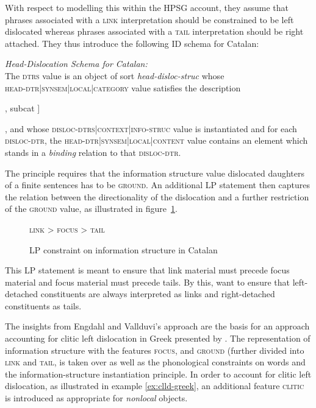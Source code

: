 \documentclass[output=paper]{langsci/langscibook}
\begin{document}
With respect to modelling this within the HPSG account, they assume
that phrases associated with a \textsc{link} interpretation should be
constrained to be left dislocated whereas phrases associated with a
\textsc{tail} interpretation should be right attached.
They thus introduce the following ID schema for Catalan:
\begin{exe}
\ex  \textit{Head-Dislocation Schema for Catalan:}\\
  The \textsc{dtrs} value is an object of sort
  \textit{head-disloc-struc} whose\\
  \textsc{head-dtr|synsem|local|category} value satisfies the
  description\\
  \begin{avm} [head verb[vform finite], subcat \elst]
  \end{avm}, and whose
  \textsc{disloc-dtrs|context|info-struc} value is instantiated and
  for each \textsc{disloc-dtr}, the
  \textsc{head-dtr|synsem|local|content} value contains an element
  which stands in a \textit{binding} relation to that
  \textsc{disloc-dtr}.
\end{exe}

The principle requires that the information structure value
dislocated daughters of a finite sentences has to be
\textsc{ground}. An additional LP statement then captures the relation
between the directionality of the dislocation and a further
restriction of the \textsc{ground} value, as illustrated in
figure~\ref{fig:lp-catalan}.
\begin{figure}[htp]
  \centering
  \textsc{link} > \textsc{focus} > \textsc{tail}
  \caption{LP constraint on information structure in Catalan}
  \label{fig:lp-catalan}
\end{figure}
This LP statement is meant to ensure that link material must precede
focus material and focus material must precede tails. By this,
\cite{EV96a} want to ensure that left-detached constituents are always
interpreted as links and right-detached constituents as tails.

The insights from Engdahl and Vallduvi's approach are the basis for an
approach accounting for clitic left dislocation in Greek presented by
\cite{AK2002a}. The representation of information structure with the
features \textsc{focus}, and \textsc{ground} (further divided into
\textsc{link} and \textsc{tail}, is taken over as well as the
phonological constraints on words and the information-structure
instantiation principle. In order to account for clitic left
dislocation, as illustrated in example \ref{ex:clld-greek}, an
additional feature \textsc{clitic} is introduced as appropriate for
\textit{nonlocal} objects.
\end{document}
